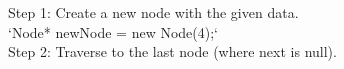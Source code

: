 \documentclass[preview]{standalone}
\begin{document}
Step 1: Create a new node with the given data.\\`Node* newNode = new Node(4);`\\Step 2: Traverse to the last node (where next is null).\\
\end{document}
